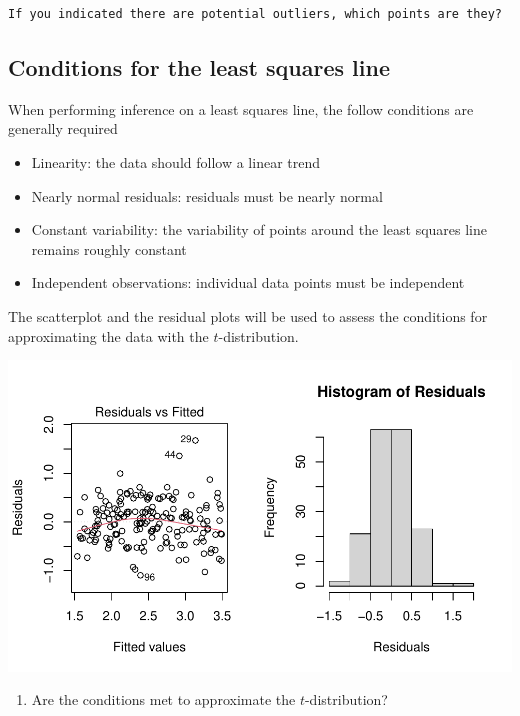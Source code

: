 \documentclass[
]{report}
\providecommand{\tightlist}{%
  \setlength{\itemsep}{0pt}\setlength{\parskip}{0pt}}
\begin{document}
\vspace{1in}

\begin{verbatim}
If you indicated there are potential outliers, which points are they?
\end{verbatim}

\vspace{0.5in}

\hypertarget{conditions-for-the-least-squares-line}{%
\subsection*{Conditions for the least squares line}\label{conditions-for-the-least-squares-line}}

When performing inference on a least squares line, the follow conditions are generally required

\begin{itemize}
\item
  Linearity: the data should follow a linear trend
\item
  Nearly normal residuals: residuals must be nearly normal
\item
  Constant variability: the variability of points around the least squares line remains roughly constant
\item
  Independent observations: individual data points must be independent
\end{itemize}

The scatterplot and the residual plots will be used to assess the conditions for approximating the data with the \(t\)-distribution.

\begin{center}\includegraphics[width=0.7\linewidth]{10-regression_files/figure-latex/unnamed-chunk-3-1} \end{center}

\begin{enumerate}
\def\labelenumi{\arabic{enumi}.}
\setcounter{enumi}{4}
\tightlist
\item
  Are the conditions met to approximate the \(t\)-distribution?
\end{enumerate}
\end{document}
